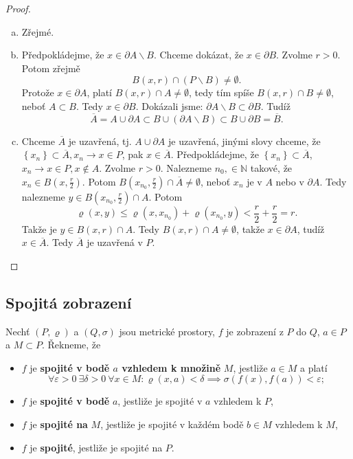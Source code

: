 \begin{proof}
	\,
	\begin{enumerate}[(a)]
		\item Zřejmé.
		\item Předpokládejme, že $x \in \partial A \smallsetminus B$. Chceme dokázat, že $x \in \partial B$.
		Zvolme $r > 0$. Potom zřejmě
		$$B(x,r) \cap (P \smallsetminus B) \ne \emptyset.$$
		Protože $x \in \partial A$, platí $B(x,r) \cap A \ne \emptyset$, tedy
		tím spíše $B(x,r) \cap B \ne \emptyset$, neboť $A\subset B$. Tedy $x \in \partial B$. Dokázali jsme:
		$\partial A \smallsetminus B \subset \partial B$. Tudíž
		$$\overline A = A\cup \partial A \subset B \cup (\partial A \smallsetminus B)\subset B \cup \partial B = \overline B.$$
		\item Chceme $\overline A$ je uzavřená, tj. $A \cup \partial A $ je uzavřená, jinými slovy chceme, že
		$\left \{ x_n \right \}\subset \overline A , x_n \to x \in P$, pak $x \in \overline A$. Předpokládejme,
		že $\left \{ x_n \right \}  \subset \overline A$, $x_n \to x \in P, x \notin A$. Zvolme $r>0$.
		Nalezneme $n_0, \in \mathbb N $ takové, že $x_n \in B \left( x, \frac{r}{2} \right ) $. Potom
		$B \left( x_{n_0}, \frac{r}{2} \right ) \cap \overline A \ne \emptyset $, neboť $x_n $ je v $A$ nebo v $\partial A$.
		Tedy nalezneme $y \in B \left ( x_{n_0}, \frac{r}{2} \right )\cap A $. Potom
		$$
		    \varrho(x,y) \leq \varrho(x,x_{n_0})+ \varrho(x_{n_0},y)<\frac{r}{2}+\frac{r}{2}=r.
		$$
		Takže je $y \in B(x,r) \cap A$. Tedy $B(x,r)\cap A \ne \emptyset$, takže $x \in \partial A$, tudíž
		$x \in \overline A$. Tedy $\overline A$ je uzavřená v $P$.\qedhere
	\end{enumerate}
\end{proof}

\subsection{Spojitá zobrazení}
\begin{definice}\label{definicespojitost}
Nechť $(P,\varrho)$ a $(Q,\sigma)$ jsou metrické prostory, $f$ je zobrazení z $P$ do $Q$, $a\in P$ a $M\subset P$.
Řekneme, že
\begin{itemize}
    \item $f$ je \textbf{spojité v bodě $a$ vzhledem k množině} $M$, jestliže $a\in M$ a platí
    \[
    \forall \varepsilon>0\ \exists \delta>0\ \forall x\in M :
    \varrho(x,a)<\delta \implies \sigma(f(x),f(a))<\varepsilon;
    \]

    \item $f$ je \textbf{spojité v bodě} $a$, jestliže je spojité v $a$ vzhledem k $P$,

    \item $f$ je \textbf{spojité na} $M$, jestliže je spojité v každém bodě $b\in M$ vzhledem k $M$,

    \item $f$ je \textbf{spojité}, jestliže je spojité na $P$.
\end{itemize}
\end{definice}

